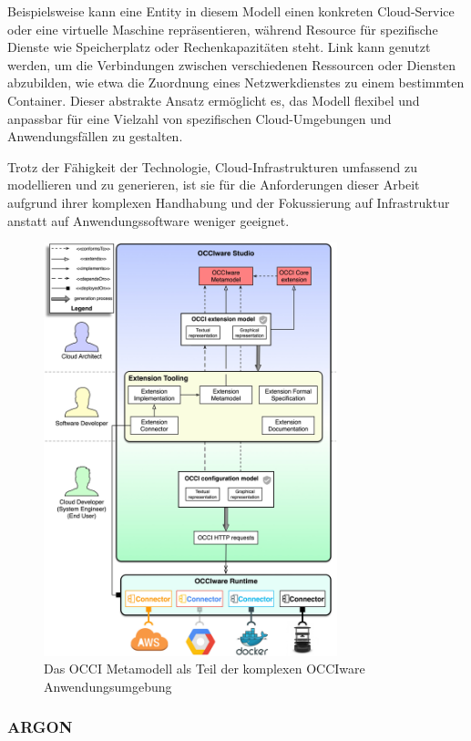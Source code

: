 Beispielsweise kann eine Entity in diesem Modell einen konkreten Cloud-Service oder eine virtuelle Maschine repräsentieren, während Resource für spezifische Dienste wie Speicherplatz oder Rechenkapazitäten steht. Link kann genutzt werden, um die Verbindungen zwischen verschiedenen Ressourcen oder Diensten abzubilden, wie etwa die Zuordnung eines Netzwerkdienstes zu einem bestimmten Container. Dieser abstrakte Ansatz ermöglicht es, das Modell flexibel und anpassbar für eine Vielzahl von spezifischen Cloud-Umgebungen und Anwendungsfällen zu gestalten.

Trotz der Fähigkeit der Technologie, Cloud-Infrastrukturen umfassend zu modellieren und zu generieren, ist sie für die Anforderungen dieser Arbeit aufgrund ihrer komplexen Handhabung und der Fokussierung auf Infrastruktur anstatt auf Anwendungssoftware weniger geeignet. 

\begin{figure}[ht]
\centering
\includegraphics[height=12cm]{bilder/k3/k3_occi_2.jpg}
\caption[OCCIware Anwendungsumgebung]{Das OCCI Metamodell als Teil der komplexen OCCIware Anwendungsumgebung \cite{zalila}}
\end{figure}

\newpage


\subsubsection{ARGON}

